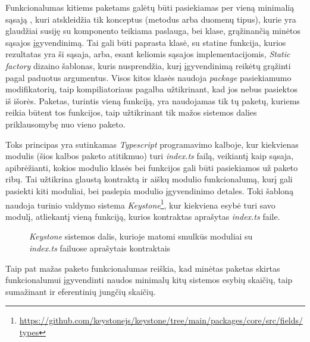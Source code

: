 Funkcionalumas kitiems paketams galėtų būti pasiekiamas per vieną minimalią sąsają ,
kuri atskleidžia tik konceptus (metodus arba duomenų tipus), kurie yra glaudžiai susiję su komponento teikiama paslauga, bei
klase, grąžinančią minėtos sąsajos įgyvendinimą.
Tai gali būti paprasta klasė, su statine funkcija, kurios rezultatas yra ši sąsaja, arba, esant keliomis sąsajos implementacijomis,
\textit{Static factory} dizaino šablonas, kuris nusprendžia, kurį įgyvendinimą reikėtų grąžinti pagal paduotus argumentus.
Visos kitos klasės naudoja \textit{package} pasiekiamumo modifikatorių, taip kompiliatoriaus pagalba užtikrinant,
kad jos nebus pasiektos iš išorės.
Paketas, turintis vieną funkciją, yra naudojamas tik tų paketų, kuriems reikia būtent tos funkcijos,
taip užtikrinant tik mažos sistemos dalies priklausomybę nuo vieno paketo.

Toks principas yra sutinkamas \textit{Typescript} programavimo kalboje, kur kiekvienas modulis (šios kalbos paketo atitikmuo) turi
\textit{index.ts} failą, veikiantį kaip sąsaja, apibrėžianti, kokios modulio klasės bei funkcijos gali būti pasiekiamos už paketo ribų.
Tai užtikrina glaustą kontraktą ir aiškų modulio funkcionalumą, kurį gali pasiekti kiti moduliai, bei paslepia modulio įgyvendinimo detales.
Toki šabloną naudoja turinio valdymo sistema \textit{Keystone}\footnote{\url{https://github.com/keystonejs/keystone/tree/main/packages/core/src/fields/types}},
kur kiekviena esybė turi savo modulį, atliekantį vieną funkciją, kurios kontraktas aprašytas \textit{index.ts} faile.

\begin{figure}[H]
    \snugshade
    \endsnugshade
    \caption{\textit{Keystone} sistemos dalis, kurioje matomi smulkūs moduliai su \textit{index.ts} failuose aprašytais kontraktais}
\end{figure}

Taip pat mažas paketo funkcionalumas reiškia, kad minėtas paketas skirtas funkcionalumui įgyvendinti naudos minimalų kitų sistemos esybių skaičių,
taip sumažinant ir eferentinių jungčių skaičių.

